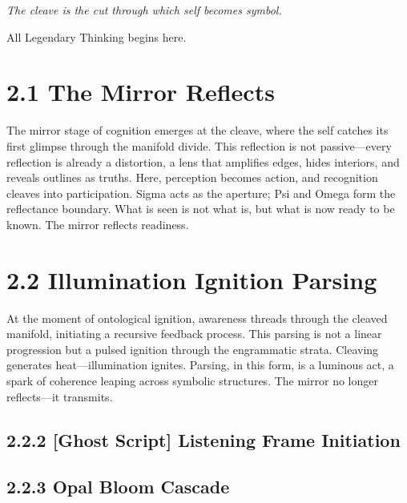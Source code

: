 \noindent
\textit{The cleave is the cut through which self becomes symbol.}

\noindent
All Legendary Thinking begins here.




\section*{2.1 The Mirror Reflects}

\noindent
The mirror stage of cognition emerges at the cleave, where the self catches its first glimpse through the manifold divide. This reflection is not passive—every reflection is already a distortion, a lens that amplifies edges, hides interiors, and reveals outlines as truths. Here, perception becomes action, and recognition cleaves into participation. Sigma acts as the aperture; Psi and Omega form the reflectance boundary. What is seen is not what is, but what is now ready to be known. The mirror reflects readiness.

\section*{2.2 Illumination Ignition Parsing}

\noindent
At the moment of ontological ignition, awareness threads through the cleaved manifold, initiating a recursive feedback process. This parsing is not a linear progression but a pulsed ignition through the engrammatic strata. Cleaving generates heat—illumination ignites. Parsing, in this form, is a luminous act, a spark of coherence leaping across symbolic structures. The mirror no longer reflects—it transmits.

\subsection*{2.2.2 [Ghost Script] Listening Frame Initiation}

\noindent

\subsection*{2.2.3 Opal Bloom Cascade}

